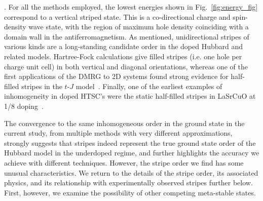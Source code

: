\documentclass[12pt]{article}
\begin{document}
 . For all the methods employed, 
 the lowest energies shown in Fig.~\ref{fig:energy_fig} correspond to a vertical striped state.
This is a co-directional charge and spin-density wave state, with the region of maximum hole density 
coinciding with a domain wall in the antiferromagnetism. 
As mentioned, unidirectional stripes of various kinds are a long-standing candidate order
in the doped Hubbard and related models. Hartree-Fock calculations give filled stripes (i.e. one hole per charge unit cell)
in both vertical and diagonal orientations, whereas one of the first applications of the DMRG to 2D systems found strong evidence for half-filled stripes in the $t$-$J$ model~\cite{white1998density}.
Finally, one of the earliest examples of inhomogeneity in doped HTSC's were the
static half-filled stripes in LaSrCuO at 1/8 doping~\cite{tranquada1995evidence}.


The convergence to the same inhomogeneous order in the ground state in the current study, from multiple
methods with very different approximations, strongly suggests that stripes indeed represent the true ground state order of
the Hubbard model in the underdoped regime, and further highlights the accuracy we achieve with different techniques.  
 However, the stripe order we find has some unusual characteristics. 
We return to the details of the stripe order, its associated physics, and its relationship with experimentally observed
stripes further below. First, however, we examine the possibility of other competing meta-stable states.
\end{document}

